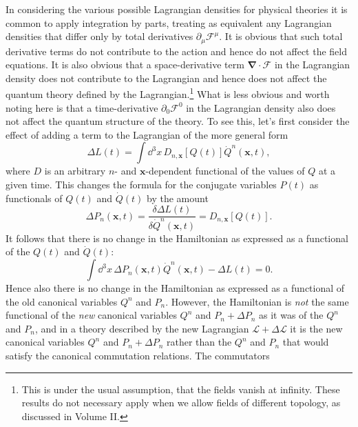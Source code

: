 In considering the various possible Lagrangian densities for physical
theories it is common to apply integration by parts, treating as equivalent
any Lagrangian densities that differ only by total derivatives
$\partial_\mu\mathcal{F}^\mu$. It is obvious that such total derivative terms do
not contribute to the action and hence do not affect the field equations. It
is also obvious that a space-derivative term $\boldsymbol{\nabla}\cdot\boldsymbol{\mathcal{F}}$
in the Lagrangian density does not contribute to the Lagrangian and hence
does not affect the quantum theory defined by the Lagrangian.\footnote{This
is under the usual assumption, that the fields vanish at infinity. These
results do not necessary apply when we allow fields of different topology,
as discussed in Volume II.} What is less obvious and worth noting here is that
a time-derivative $\partial_0\mathcal{F}^0$ in the Lagrangian density also does
not affect the quantum structure of the theory. To see this, let's first consider
the effect of adding a term to the Lagrangian of the more general form
\begin{equation}
\Delta L(t)=\int \dd^3x\,D_{n,\mathbf{x}}[Q(t)]\dot Q^n(\mathbf{x},t),
\tag{7.2.36}\label{eq:7.2.36}
\end{equation}
where $D$ is an arbitrary $n$- and $\mathbf{x}$-dependent functional of the values
of $Q$ at a given time. This changes the formula for the conjugate variables
$P(t)$ as functionals of $Q(t)$ and $\dot Q(t)$ by the amount
\begin{equation}
\Delta P_n(\mathbf{x},t)=
\frac{\delta\Delta L(t)}{\delta\dot Q^n(\mathbf{x},t)}
=D_{n,\mathbf{x}}[Q(t)].
\tag{7.2.37}\label{eq:7.2.37}
\end{equation}
It follows that there is no change in the Hamiltonian as expressed as a
functional of the $Q(t)$ and $\dot Q(t)$:
\begin{equation}
\int \dd^3x\,\Delta P_n(\mathbf{x},t)\dot Q^n(\mathbf{x},t)-\Delta L(t)=0.
\tag{7.2.38}\label{eq:7.2.38}
\end{equation}
Hence also there is no change in the Hamiltonian as expressed as a
functional of the old canonical variables $Q^n$ and $P_n$. However, the
Hamiltonian is \textit{not} the same functional of the \textit{new} canonical variables
$Q^n$ and $P_n+\Delta P_n$ as it was of the $Q^n$ and $P_n$, and in a theory
described by the new Lagrangian $\mathcal{L}+\Delta\mathcal{L}$ it is the new
canonical variables $Q^n$ and $P_n+\Delta P_n$ rather than the $Q^n$ and $P_n$
that would satisfy the canonical commutation relations. The commutators
